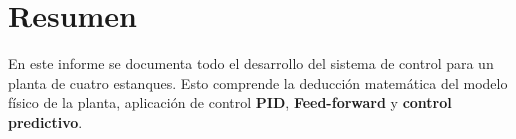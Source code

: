 \section*{Resumen}
En este informe se documenta todo el desarrollo del sistema de control para un planta de cuatro estanques. Esto comprende la deducción matemática del modelo físico de la planta, aplicación de control \textbf{PID}, \textbf{Feed-forward} y \textbf{control predictivo}.
